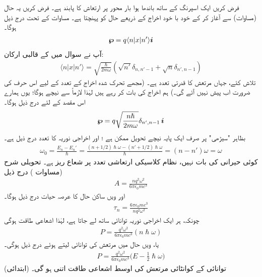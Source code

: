 فرض کریں ایک  اسپرنگ کے ساتھ باندھا ہوا بار  محور  پر ارتعاش کا پابند ہے۔ فرض  کریں یہ حال  (مساوات)  سے آغاز کر کے خود با خود اخراج   کے ذریعے  حال  کو  پہنچتا ہے۔ مساوات کے تحت درج ذیل ہوگا۔
\begin{align*}
	{\ensuremath{{\boldsymbol{\wp}}}} = q\langle n|x|n'\rangle{\boldsymbol{i}}
\end{align*}
آپ نے سوال  میں  کے قالبی ارکان:
\begin{align*}
	\langle n|x|n'\rangle = \sqrt{\frac{\hslash}{2m\omega}}(\sqrt{n'}\delta_{n,n'-1}+\sqrt{n}\delta_{n',n-1})
\end{align*}
 تلاش کئے، جہاں مرتعش کا  قدرتی تعدد  ہے۔ (مجھے تحرک شدہ اخراج کے تعدد کے لیے اس حرف کی ضرورت اب پیش نہیں آئے گی۔)   ہم اخراج کی بات کر رہے ہیں لہٰذا  لازماً   سے نیچے  ہوگا؛ یوں  ہمارے اس مقصد کے لئے درج ذیل ہوگا۔
\begin{align}
	{\ensuremath{{\boldsymbol{\wp}}}} = q\sqrt{\frac{n\hslash}{2m\omega}}\delta_{n', n-1}\,{\boldsymbol{i}}
\end{align}
بظاہر  "سیڑھی"  پر صرف ایک پایہ   نیچے تحویل  ممکن ہے ؛  اور اخراجی نوریہ کا تعدد درج ذیل ہے۔
\begin{align}
	\omega_0 = \frac{E_n-E_n'}{\hslash} = \frac{(n+1/2)\hslash\omega - (n'+ 1/2)\hslash\omega}{\hslash} =(n-n')\omega = \omega
\end{align}
کوئی حیرانی  کی بات نہیں،  نظام کلاسیکی ارتعاشی تعدد پر  شعاع ریز   ہے۔ تحویلی شرح  (مساوات )  درج ذیل
\begin{align}
	A = \frac{nq^2\omega^2}{6\pi\epsilon_0mc^3}
\end{align}
اور ویں ساکن حال کا عرصہ حیات درج ذیل ہوگا۔
\begin{align}
	\tau_n = \frac{6\pi\epsilon_0mc^3}{nq^2\omega^2}
\end{align}
چونکہ،  ہر ایک اخراجی نوریہ  توانائی ساتھ لے جاتا ہے،  لہٰذا  اشعاعی  طاقت  ہوگی
\begin{align*}
	P = \frac{q^2\omega^2}{6\pi\epsilon_0mc^3}(n\hslash\omega)
\end{align*}
یا،  ویں حال میں مرتعش کی توانائی  لیتے ہوئے درج ذیل ہوگی۔
\begin{align}\label{مساوات_تابع_مضطرب_زمینی_توانائی_رہے_گی}
	P = \frac{q^2\omega^2}{6\pi\epsilon_0mc^3}\big(E-\frac{1}{2}\hslash\omega\big)
\end{align}
(ابتدائی)  توانائی  کے کوانٹائی مرتعش کی  اوسط اشعاعی     طاقت اتنی  ہو گی۔

